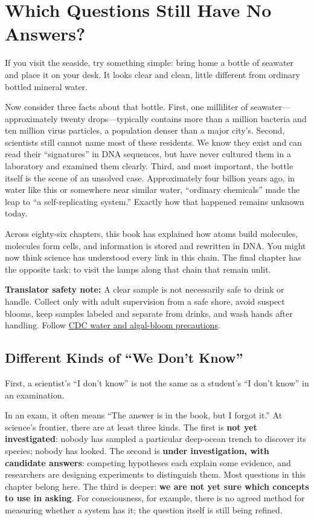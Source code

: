 \chapter{Which Questions Still Have No Answers?}

\begin{kaichang}
If you visit the seaside, try something simple: bring home a bottle of seawater and place it on your desk. It looks clear and clean, little different from ordinary bottled mineral water.

Now consider three facts about that bottle. First, one milliliter of seawater---approximately twenty drops---typically contains more than a million bacteria and ten million virus particles, a population denser than a major city's. Second, scientists still cannot name most of these residents. We know they exist and can read their ``signatures'' in DNA sequences, but have never cultured them in a laboratory and examined them clearly. Third, and most important, the bottle itself is the scene of an unsolved case. Approximately four billion years ago, in water like this or somewhere near similar water, ``ordinary chemicals'' made the leap to ``a self-replicating system.'' Exactly how that happened remains unknown today.

Across eighty-six chapters, this book has explained how atoms build molecules, molecules form cells, and information is stored and rewritten in DNA. You might now think science has understood every link in this chain. The final chapter has the opposite task: to visit the lamps along that chain that remain unlit.
\end{kaichang}

\textbf{Translator safety note:} A clear sample is not necessarily safe to drink or handle. Collect only with adult supervision from a safe shore, avoid suspect blooms, keep samples labeled and separate from drinks, and wash hands after handling. Follow \href{https://cdc.gov/harmful-algal-blooms/prevention/index.html}{CDC water and algal-bloom precautions}.

\section{Different Kinds of ``We Don't Know''}

First, a scientist's ``I don't know'' is not the same as a student's ``I don't know'' in an examination.

In an exam, it often means ``The answer is in the book, but I forgot it.'' At science's frontier, there are at least three kinds. The first is \textbf{not yet investigated}: nobody has sampled a particular deep-ocean trench to discover its species; nobody has looked. The second is \textbf{under investigation, with candidate answers}: competing hypotheses each explain some evidence, and researchers are designing experiments to distinguish them. Most questions in this chapter belong here. The third is deeper: \textbf{we are not yet sure which concepts to use in asking}. For consciousness, for example, there is no agreed method for measuring whether a system has it; the question itself is still being refined.

